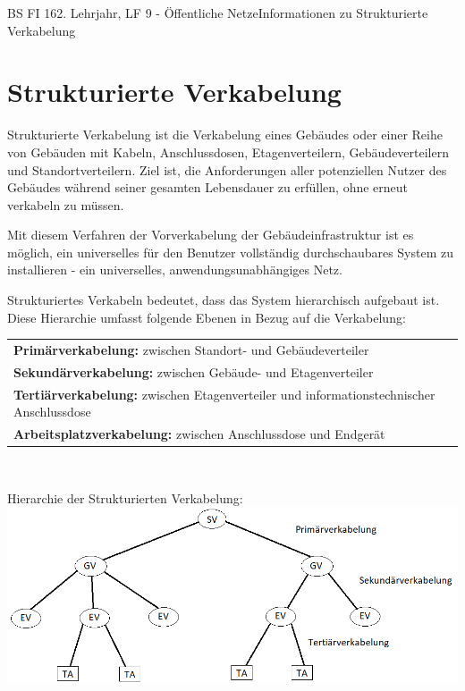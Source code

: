 \documentclass[11pt,twocolumn,oneside,openany,headings=optiontotoc,11pt,numbers=noenddot]{article}
\begin{document}
	\begin{worksheet}{BS FI 16}{2. Lehrjahr, LF 9 - Öffentliche Netze}{Informationen zu \glqq{}Strukturierte Verkabelung\grqq{}}
		\section{Strukturierte Verkabelung}
		Strukturierte Verkabelung ist die Verkabelung eines Gebäudes oder einer Reihe von Gebäuden mit Kabeln, Anschlussdosen, Etagenverteilern, Gebäudeverteilern und Standortverteilern. Ziel ist, die Anforderungen aller potenziellen Nutzer des Gebäudes während seiner gesamten Lebensdauer zu erfüllen, ohne erneut verkabeln zu müssen.\\
		\par\noindent
		Mit diesem Verfahren der Vorverkabelung der Gebäudeinfrastruktur ist es möglich, ein universelles für den Benutzer vollständig durchschaubares System zu installieren - ein universelles, anwendungsunabhängiges Netz.\\
		\par\noindent
		Strukturiertes Verkabeln bedeutet, dass das System hierarchisch aufgebaut ist. Diese Hierarchie umfasst folgende Ebenen in Bezug auf die Verkabelung:\\
		\par\noindent
		\begin{tabularx}{0.5\textwidth}{X}
			\textbullet \textbf{Primärverkabelung:} zwischen Standort- und Gebäudeverteiler\\
			\textbullet \textbf{Sekundärverkabelung:} zwischen Gebäude- und Etagenverteiler\\
			\textbullet \textbf{Tertiärverkabelung:} zwischen Etagenverteiler und informationstechnischer Anschlussdose\\
			\textbullet \textbf{Arbeitsplatzverkabelung:} zwischen Anschlussdose und Endgerät
		\end{tabularx}\\
		\par\noindent
		Hierarchie der Strukturierten Verkabelung:\\
		\includegraphics[scale=0.45]{Bilder/struktVerk.png}\\

\end{worksheet}
\end{document}

